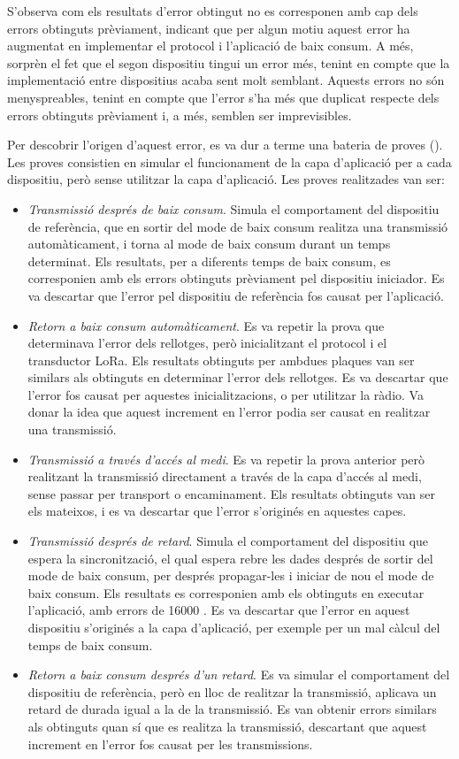 \documentclass{tfgitic}[2024/07/01]
\begin{document}
{S'observa com els resultats d'error obtingut no es corresponen amb cap dels errors obtinguts prèviament, indicant que per algun motiu aquest error ha augmentat en implementar el protocol i l'aplicació de baix consum. A més, sorprèn el fet que el segon dispositiu tingui un error més, tenint en compte que la implementació entre dispositius acaba sent molt semblant. Aquests errors no són menyspreables, tenint en compte que l'error s'ha més que duplicat respecte dels errors obtinguts prèviament i, a més, semblen ser imprevisibles.

Per descobrir l'origen d'aquest error, es va dur a terme una bateria de proves (). Les proves consistien en simular el funcionament de la capa d'aplicació per a cada dispositiu, però sense utilitzar la capa d'aplicació. Les proves realitzades van ser:
\begin{itemize}
    \item \emph{Transmissió després de baix consum}. Simula el comportament del dispositiu de referència, que en sortir del mode de baix consum realitza una transmissió automàticament, i torna al mode de baix consum durant un temps determinat. Els resultats, per a diferents temps de baix consum, es corresponien amb els errors obtinguts prèviament pel dispositiu iniciador. Es va descartar que l'error pel dispositiu de referència fos causat per l'aplicació.
    \item \emph{Retorn a baix consum automàticament}. Es va repetir la prova que determinava l'error dels rellotges, però inicialitzant el protocol i el transductor LoRa. Els resultats obtinguts per ambdues plaques van ser similars als obtinguts en determinar l'error dels rellotges. Es va descartar que l'error fos causat per aquestes inicialitzacions, o per utilitzar la ràdio. Va donar la idea que aquest increment en l'error podia ser causat en realitzar una transmissió.
    \item \emph{Transmissió a través d'accés al medi}. Es va repetir la prova anterior però realitzant la transmissió directament a través de la capa d'accés al medi, sense passar per transport o encaminament. Els resultats obtinguts van ser els mateixos, i es va descartar que l'error s'originés en aquestes capes.
    \item \emph{Transmissió després de retard}. Simula el comportament del dispositiu que espera la sincronització, el qual espera rebre les dades després de sortir del mode de baix consum, per després propagar-les i iniciar de nou el mode de baix consum. Els resultats es corresponien amb els obtinguts en executar l'aplicació, amb errors de 16000 . Es va descartar que l'error en aquest dispositiu s'originés a la capa d'aplicació, per exemple per un mal càlcul del temps de baix consum.
    \item \emph{Retorn a baix consum després d'un retard}. Es va simular el comportament del dispositiu de referència, però en lloc de realitzar la transmissió, aplicava un retard de durada igual a la de la transmissió. Es van obtenir errors similars als obtinguts quan sí que es realitza la transmissió, descartant que aquest increment en l'error fos causat per les transmissions.  
\end{itemize}

}
\end{document}
